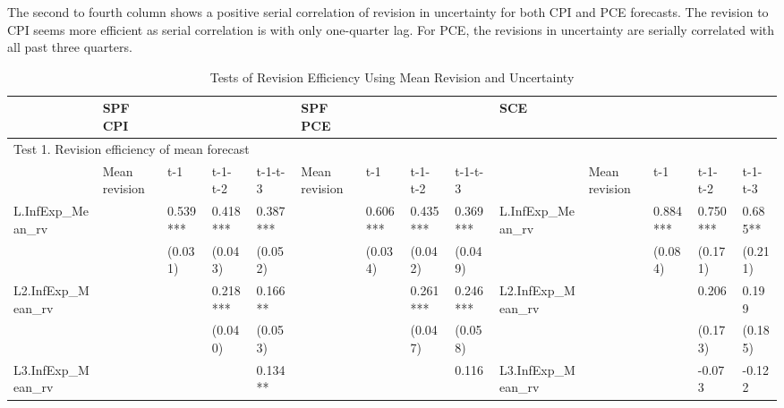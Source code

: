 \documentclass[12pt]{article}
\begin{document}
	The second to fourth column shows a positive serial correlation of revision in uncertainty for both CPI and PCE forecasts. The revision to CPI seems more efficient as serial correlation is with only one-quarter lag. For PCE, the revisions in uncertainty are serially correlated with all past three quarters. 
	
		\begin{table}
			\begin{adjustbox}{width={24cm},totalheight={14cm}}
				\begin{threeparttable}
					\caption{Tests of Revision Efficiency Using Mean Revision and Uncertainty}
					\label{RevEfficiency}
				\begin{tabular}{llllllllllllll}
					\hline 
					& SPF CPI       &           &          &          & SPF PCE       &           &           &           & \multicolumn{5}{l}{SCE}                                              \\
					\hline 
					\multicolumn{14}{l}{Test 1.  Revision efficiency of mean forecast}                                                                                                                               \\
					\hline 
					& Mean revision & t-1       & t-1- t-2 & t-1-t-3  & Mean revision & t-1       & t-1- t-2  & t-1-t-3   &                     & Mean revision & t-1      & t-1- t-2 & t-1-t-3  \\
					\hline 
					L.InfExp\_Mean\_rv  &               & 0.539***  & 0.418*** & 0.387*** &               & 0.606***  & 0.435***  & 0.369***  & L.InfExp\_Mean\_rv  &               & 0.884*** & 0.750*** & 0.685**  \\
					&               & (0.031)   & (0.043)  & (0.052)  &               & (0.034)   & (0.042)   & (0.049)   &                     &               & (0.084)  & (0.171)  & (0.211)  \\
					L2.InfExp\_Mean\_rv &               &           & 0.218*** & 0.166**  &               &           & 0.261***  & 0.246***  & L2.InfExp\_Mean\_rv &               &          & 0.206    & 0.199    \\
					&               &           & (0.040)  & (0.053)  &               &           & (0.047)   & (0.058)   &                     &               &          & (0.173)  & (0.185)  \\
					L3.InfExp\_Mean\_rv &               &           &          & 0.134**  &               &           &           & 0.116     & L3.InfExp\_Mean\_rv &               &          & -0.073   & -0.122   \\

\end{tabular}
\end{threeparttable}
\end{adjustbox}
\end{table}
\end{document}
